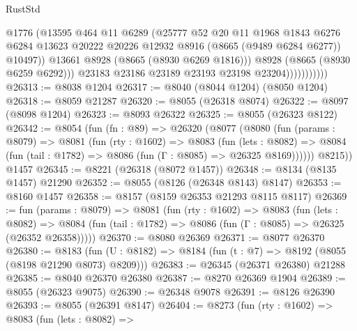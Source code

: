 \begin{lexlean}{RustStd}
\begin{coremodule}
                              @1776
                              (@13595
                                @464
                                @11
                                @6289
                                (@25777
                                  @52
                                  @20
                                  @11
                                  @1968
                                  @1843
                                  @6276
                                  @6284
                                  @13623
                                  @20222
                                  @20226
                                  @12932
                                  @8916
                                  (@8665 (@9489 @6284 @6277))
                                  @10497))
                              @13661
                              @8928
                              (@8665 (@8930 @6269 @1816)))
                            @8928
                            (@8665 (@8930 @6259 @6292)))
                          @23183
                          @23186
                          @23189
                          @23193
                          @23198
                          @23204)))))))))))
@26313 := @8038 @1204
@26317 := @8040 (@8044 @1204) (@8050 @1204)
@26318 := @8059 @21287
@26320 := @8055 (@26318 @8074)
@26322 := @8097 (@8098 @1204)
@26323 := @8093 @26322
@26325 := @8055 (@26323 @8122)
@26342 := @8054
    (fun (fn : @89) =>
    @26320
      (@8077
        (@8080
          (fun (params : @8079) =>
          @8081
            (fun (rty : @1602) =>
            @8083
              (fun (lets : @8082) =>
              @8084 (fun (tail : @1782) => @8086 (fun (Γ : @8085) => @26325 @8169))))))
        @8215))
    @1457
@26345 := @8221 (@26318 (@8072 @1457))
@26348 := @8134 (@8135 @1457) @21290
@26352 := @8055 (@8126 (@26348 @8143) @8147)
@26353 := @8160 @1457
@26358 := @8157 (@8159 @26353 @21293 @8115 @8117)
@26369 := fun (params : @8079) =>
  @8081
    (fun (rty : @1602) =>
    @8083
      (fun (lets : @8082) =>
      @8084 (fun (tail : @1782) => @8086 (fun (Γ : @8085) => @26325 (@26352 @26358)))))
@26370 := @8080 @26369
@26371 := @8077 @26370
@26380 := @8183
    (fun (U : @8182) => @8184 (fun (t : @7) => @8192 (@8055 (@8198 @21290 @8073) @8209)))
@26383 := @26345 (@26371 @26380) @21288
@26385 := @8040 @26370 @26380
@26387 := @8270 @26369 @1904
@26389 := @8055 (@26323 @9075)
@26390 := @26348 @9078
@26391 := @8126 @26390
@26393 := @8055 (@26391 @8147)
@26404 := @8273
    (fun (rty : @1602) =>
    @8083
      (fun (lets : @8082) =>

\end{coremodule}
\end{lexlean}
